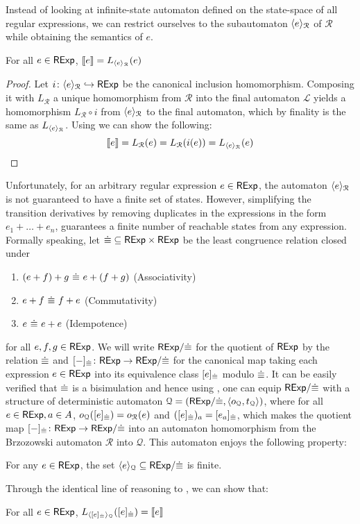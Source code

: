 Instead of looking at infinite-state automaton defined on the state-space of all regular expressions, we can restrict ourselves to the subautomaton $\langle e \rangle_{\mathcal{R}}$ of $\mathcal{R}$ while obtaining the semantics of $e$.
\begin{lemma}\label{c2:lem:adequacy2}
    For all $e \in \mathsf{RExp}$, $\left\llbracket{e}\right\rrbracket = L_{\langle e \rangle_{\mathcal{R}}}(e)$
\end{lemma}
\begin{proof}
    Let $i \colon \langle e \rangle_{\mathcal{R}} \hookrightarrow \mathsf{RExp}$ be the canonical inclusion homomorphism. Composing it with $L_{\mathcal{R}}$ a unique homomorphism from $\mathcal{R}$ into the final automaton $\mathcal{L}$ yields a homomorphism $L_{\mathcal{R}} \circ i$ from $\langle e \rangle_{\mathcal{R}}$ to the final automaton, which by finality is the same as $L_{\langle e \rangle_{\mathcal{R}}}$. Using  we can show the following: 
    \[
        \left\llbracket{e}\right\rrbracket = L_{\mathcal{R}}(e)=  L_{\mathcal{R}}(i(e)) = L_{\langle e \rangle_{\mathcal{R}}}(e)
    \]
\end{proof}
Unfortunately, for an arbitrary regular expression $e \in \mathsf{RExp}$, the automaton $\langle e \rangle_{\mathcal{R}}$ is not guaranteed to have a finite set of states. 
However, simplifying the transition derivatives by removing duplicates in the expressions in the form $e_1 + \dots + e_n$, guarantees a finite number of reachable states from any expression. Formally speaking, let ${{\mathrel{\dot\equiv}}} \subseteq {\mathsf{RExp}\times \mathsf{RExp}}$ be the least congruence relation closed under
\begin{enumerate}
	\item $ {{(e + f) + g} {~{\mathrel{\dot\equiv}}~} {e + (f+g)}}$ (Associativity)
	\item ${e + f} {~{\mathrel{\dot\equiv}}~} {f + e}$ (Commutativity)
	\item ${e} {~{\mathrel{\dot\equiv}}~} {e + e}$ (Idempotence) 
\end{enumerate}
	 for all $e,f,g \in \mathsf{RExp}$. 
We will write ${{\mathsf{RExp}}/{{\mathrel{\dot\equiv}}}}$ for the quotient of $\mathsf{RExp}$ by the relation ${\mathrel{\dot\equiv}}$ and $[-]_{{\mathrel{\dot\equiv}}} \colon \mathsf{RExp} \to {\mathsf{RExp}}/{{\mathrel{\dot\equiv}}}$ for the canonical map taking each expression $e \in \mathsf{RExp}$ into its equivalence class $[e]_{{\mathrel{\dot\equiv}}}$ modulo ${\mathrel{\dot\equiv}}$. It can be easily verified that ${\mathrel{\dot\equiv}}$ is a bisimulation and hence using , one can equip ${\mathsf{RExp}}/{{\mathrel{\dot\equiv}}}$ with a structure of deterministic automaton $\mathcal{Q} = ({\mathsf{RExp}}/{{\mathrel{\dot\equiv}}}, \langle o_{\mathcal{Q}}, t_{\mathcal{Q}} \rangle)$, where for all $e \in \mathsf{RExp}, a \in {A}$, $o_{\mathcal{Q}}([e]_{{\mathrel{\dot\equiv}}})=o_{\mathcal{R}}(e)$ and $([e]_{{\mathrel{\dot\equiv}}})_a = [e_a]_{{\mathrel{\dot\equiv}}}$, which makes the quotient map $[-]_{{\mathrel{\dot\equiv}}} \colon \mathsf{RExp} 
\to {\mathsf{RExp}}/{{\mathrel{\dot\equiv}}}$ into an automaton homomorphism from the Brzozowski automaton $\mathcal{R}$ into $\mathcal{Q}$. This automaton enjoys the following property:
\begin{lemma}\label{c2:lem:locally_finite}
    For any $e \in \mathsf{RExp}$, the set $\langle e \rangle_{\mathcal{Q}} \subseteq {\mathsf{RExp}}/{{\mathrel{\dot\equiv}}}$ is finite.
\end{lemma}
Through the identical line of reasoning to , we can show that:
\begin{lemma}
	For all $e \in \mathsf{RExp}$, $L_{\langle [e]_{{\mathrel{\dot\equiv}}} \rangle_{\mathcal{Q}}}([e]_{{\mathrel{\dot\equiv}}}) = \left\llbracket{e}\right\rrbracket$
\end{lemma}
